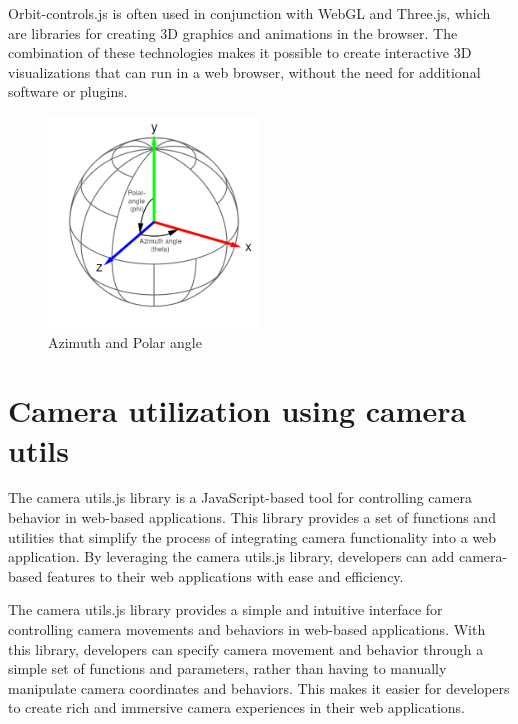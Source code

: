 Orbit-controls.js is often used in conjunction with WebGL and Three.js, which are libraries for creating 
3D graphics and animations in the browser. The combination of these technologies makes it possible to create 
interactive 3D visualizations that can run in a web browser, without the need for additional software or plugins.
\\
\begin{figure}[htb]
  \centering
  \includegraphics[width=0.5\textwidth]{pics/orbitcontrols.png}
  \caption{Azimuth and Polar angle}
  \label{fig:orbitcontrols}
\end{figure}
\newpage

\section{Camera utilization using camera utils}
The camera utils.js library is a JavaScript-based tool for controlling camera behavior in web-based applications. 
This library provides a set of functions and utilities that simplify the process of integrating camera functionality 
into a web application. By leveraging the camera utils.js library, developers can add camera-based features to 
their web applications with ease and efficiency.

The camera utils.js library provides a simple and intuitive interface for controlling camera movements and behaviors 
in web-based applications. With this library, developers can specify camera movement and behavior through a simple 
set of functions and parameters, rather than having to manually manipulate camera coordinates and behaviors. 
This makes it easier for developers to create rich and immersive camera experiences in their web applications.

